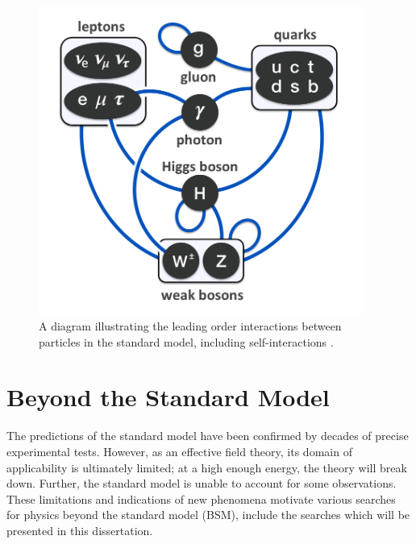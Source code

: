 \begin{figure}[hbt]
\begin{center}
\includegraphics[width=0.95\textwidth]{figures/Elementary_particle_interactions_in_the_Standard_Model.png}
\caption{A diagram illustrating the leading order interactions between particles in the standard model, including self-interactions \cite{Drexler}.}
\label{fig:sm-interactions}
\end{center}
\end{figure}

\addtocounter{section}{-1}
\renewcommand{\thesection}{\thechapter.{$\frac{1}{2}$}}
\section{Beyond the Standard Model}
\renewcommand{\thesection}{\thechapter.\arabic{section}} %

The predictions of the standard model have been confirmed by decades of precise experimental tests. However, as an effective field theory, its domain of applicability is ultimately limited; at a high enough energy, the theory will break down. Further, the standard model is unable to account for some observations. These limitations and indications of new phenomena motivate various searches for physics beyond the standard model (BSM), include the searches which will be presented in this dissertation.

